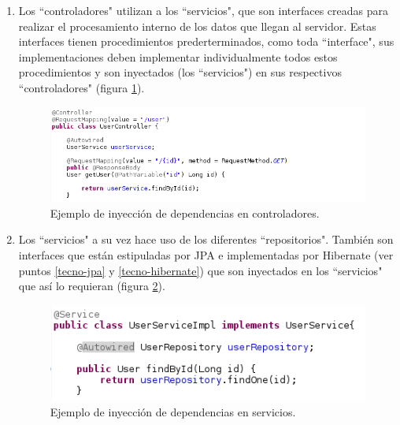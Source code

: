     \begin{enumerate}
        \item Los ``controladores" utilizan a los ``servicios", que son interfaces creadas para realizar el procesamiento interno de los datos que llegan al servidor. Estas interfaces tienen procedimientos prederterminados, como toda ``interface", sus implementaciones deben implementar individualmente todos estos procedimientos y son inyectados (los ``servicios") en sus respectivos ``controladores" (figura \ref{img-controllerdi}).
        
        \begin{figure}[htbp!]
            \begin{center}
                \includegraphics[width=.8\textwidth]{figures/controller}
            \end{center}
            \caption{Ejemplo de inyección de dependencias en controladores.}
            \label{img-controllerdi}
        \end{figure}
        
        \item Los ``servicios" a su vez hace uso de los diferentes ``repositorios". También son interfaces que están estipuladas por JPA e implementadas por Hibernate (ver puntos \ref{tecno-jpa} y \ref{tecno-hibernate}) que son inyectados en los ``servicios" que así lo requieran (figura \ref{img-servicerdi}).

        \begin{figure}[htbp!]
            \begin{center}
                \includegraphics[width=.8\textwidth]{figures/serviceimpl}
            \end{center}
            \caption{Ejemplo de inyección de dependencias en servicios.}
            \label{img-servicerdi}
        \end{figure}        
        
    \end{enumerate}
    
\pagebreak